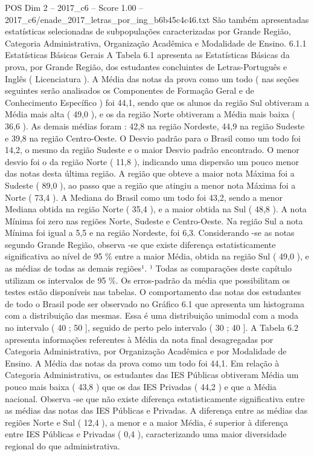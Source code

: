\begin{textsample}{POS Dim 2 – 2017\_c6 – Score 1.00 – 2017\_c6/enade\_2017\_letras\_por\_ing\_b6b45c4c46.txt}
São também apresentadas estatísticas selecionadas de subpopulações caracterizadas por Grande Região, Categoria Administrativa, Organização Acadêmica e Modalidade de Ensino. 6.1.1 Estatísticas Básicas Gerais A Tabela 6.1 apresenta as Estatísticas Básicas da prova, por Grande Região, dos estudantes concluintes de Letras-Português e Inglês ( Licenciatura ).
A Média das notas da prova como um todo ( nas seções seguintes serão analisados os Componentes de Formação Geral e de Conhecimento Específico ) foi 44,1, sendo que os alunos da região Sul obtiveram a Média mais alta ( 49,0 ), e os da região Norte obtiveram a Média mais baixa ( 36,6 ).
As demais médias foram : 42,8 na região Nordeste, 44,9 na região Sudeste e 39,8 na região Centro-Oeste.
O Desvio padrão para o Brasil como um todo foi 14,2, o mesmo da região Sudeste e o maior Desvio padrão encontrado.
O menor desvio foi o da região Norte ( 11,8 ), indicando uma dispersão um pouco menor das notas desta última região.
A região que obteve a maior nota Máxima foi a Sudeste ( 89,0 ), ao passo que a região que atingiu a menor nota Máxima foi a Norte ( 73,4 ).
A Mediana do Brasil como um todo foi 43,2, sendo a menor Mediana obtida na região Norte ( 35,4 ), e a maior obtida na Sul ( 48,8 ).
A nota Mínima foi zero nas regiões Norte, Sudeste e Centro-Oeste.
Na região Sul a nota Mínima foi igual a 5,5 e na região Nordeste, foi 6,3.
Considerando -se as notas segundo Grande Região, observa -se que existe diferença estatisticamente significativa ao nível de 95 \% entre a maior Média, obtida na região Sul ( 49,0 ), e as médias de todas as demais regiões¹. ¹ Todas as comparações deste capítulo utilizam os intervalos de 95 \%.
Os erros-padrão da média que possibilitam os testes estão disponíveis nas tabelas.
O comportamento das notas dos estudantes de todo o Brasil pode ser observado no Gráfico 6.1 que apresenta um histograma com a distribuição das mesmas.
Essa é uma distribuição unimodal com a moda no intervalo ( 40 ; 50 ], seguido de perto pelo intervalo ( 30 ; 40 ].
A Tabela 6.2 apresenta informações referentes à Média da nota final desagregadas por Categoria Administrativa, por Organização Acadêmica e por Modalidade de Ensino.
A Média das notas da prova como um todo foi 44,1.
Em relação à Categoria Administrativa, os estudantes das IES Públicas obtiveram Média um pouco mais baixa ( 43,8 ) que os das IES Privadas ( 44,2 ) e que a Média nacional.
Observa -se que não existe diferença estatisticamente significativa entre as médias das notas das IES Públicas e Privadas.
A diferença entre as médias das regiões Norte e Sul ( 12,4 ), a menor e a maior Média, é superior à diferença entre IES Públicas e Privadas ( 0,4 ), caracterizando uma maior diversidade regional do que administrativa.

\end{textsample}
